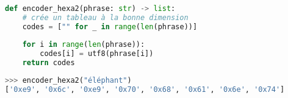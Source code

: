 \documentclass[svgnames,11pt]{beamer}
\begin{document}
\begin{frame}[fragile]
    \frametitle{}

\begin{center}
\begin{lstlisting}[language=Python , basicstyle=\ttfamily\small, xleftmargin=2em, xrightmargin=2em]
def encoder_hexa2(phrase: str) -> list:
    # crée un tableau à la bonne dimension
    codes = ["" for _ in range(len(phrase))]
    
    for i in range(len(phrase)):
        codes[i] = utf8(phrase[i])
    return codes
\end{lstlisting}
\end{center} 
\begin{center}
\begin{lstlisting}[language=Python , basicstyle=\ttfamily\small, xleftmargin=2em, xrightmargin=2em]
>>> encoder_hexa2("éléphant")
['0xe9', '0x6c', '0xe9', '0x70', '0x68', '0x61', '0x6e', '0x74']
\end{lstlisting}
\label{CODE}
\end{center}   

\end{frame}
\end{document}
